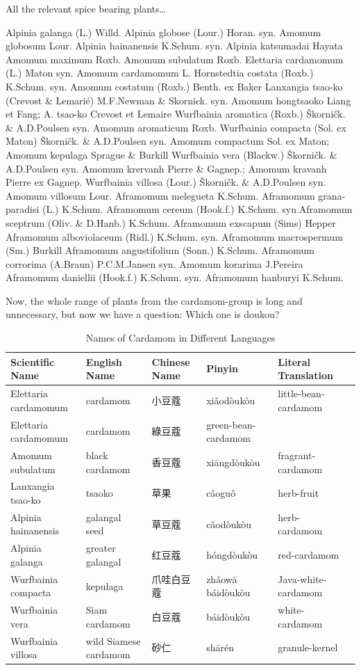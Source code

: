 \documentclass[12pt]{article}
\begin{document}
All the relevant spice bearing plants…

Alpinia galanga (L.) Willd. 
Alpinia globose (Lour.) Horan. syn. Amomum globosum Lour.
Alpinia hainanensis K.Schum. syn. Alpinia katsumadai Hayata
Amomum maximum Roxb.	
Amomum subulatum Roxb.	
Elettaria cardamomum (L.) Maton syn. Amomum cardamomum L.
Hornstedtia costata (Roxb.) K.Schum. syn. Amomum costatum (Roxb.) Benth. ex Baker
Lanxangia tsao-ko (Crevost \& Lemarié) M.F.Newman \& Skornick. syn. Amomum hongtsaoko Liang et Fang; A. tsao-ko Crevost et Lemaire
Wurfbainia aromatica (Roxb.) Škorničk. \& A.D.Poulsen syn. Amomum aromaticum Roxb.
Wurfbainia compacta (Sol. ex Maton) Škorničk. \& A.D.Poulsen syn. Amomum compactum Sol. ex Maton; Amomum kepulaga Sprague \& Burkill
Wurfbainia vera (Blackw.) Škorničk. \& A.D.Poulsen syn. Amomum krervanh Pierre \& Gagnep.; Amomum kravanh Pierre ex Gagnep.
Wurfbainia villosa (Lour.) Škorničk. \& A.D.Poulsen syn. Amomum villosum Lour.
Aframomum melegueta K.Schum.	Aframomum grana-paradisi (L.) K.Schum. 
Aframomum cereum (Hook.f.) K.Schum. syn.Aframomum sceptrum (Oliv. \& D.Hanb.) K.Schum.
Aframomum exscapum (Sims) Hepper	
Aframomum alboviolaceum (Ridl.) K.Schum. syn. Aframomum macrospermum (Sm.) Burkill
Aframomum angustifolium (Sonn.) K.Schum.	
Aframomum corrorima (A.Braun) P.C.M.Jansen	 syn. Amomum korarima J.Pereira
Aframomum daniellii	(Hook.f.) K.Schum. syn. Aframomum hanburyi K.Schum.

Now, the whole range of plants from the cardamom-group is long and unnecessary, but now we have a question: Which one is doukou?



\begin{table}[ht]
    \centering
    \begin{tabular}{llllll}
    \toprule
    \textbf{Scientific Name} & \textbf{English Name} & \textbf{Chinese Name} & \textbf{Pinyin} & \textbf{Literal Translation} \\
    \midrule
    Elettaria cardamomum & cardamom & 小豆蔻 & xiǎodòukòu & little-bean-cardamom \\
    Elettaria cardamomum & cardamom & 綠豆蔻 & green-bean-cardamom \\
    Amomum subulatum & black cardamom & 香豆蔻 & xiāngdòukòu & fragrant-cardamom \\
    Lanxangia tsao-ko & tsaoko & 草果 & cǎoguǒ & herb-fruit \\
    Alpinia hainanensis & galangal seed & 草豆蔻 & cǎodòukòu & herb-cardamom \\
    Alpinia galanga & greater galangal & 红豆蔻 & hóngdòukòu & red-cardamom \\
    Wurfbainia compacta & kepulaga & 爪哇白豆蔻 & zhǎowā báidòukòu & Java-white-cardamom \\
    Wurfbainia vera & Siam cardamom & 白豆蔻 & báidòukòu & white-cardamom \\
    Wurfbainia villosa & wild Siamese cardamom & 砂仁 & shārén & granule-kernel \\
    \bottomrule
    \end{tabular}
    \caption{Names of Cardamom in Different Languages}
    \label{tab:cardamom-names}
    \end{table}
\end{document}
